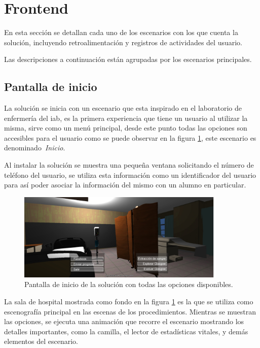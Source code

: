 \section{Frontend}

En esta sección se detallan cada uno de los escenarios con los que cuenta 
la solución, incluyendo retroalimentación y registros de actividades del 
usuario.

Las descripciones a continuación están agrupadas por los escenarios principales.

\subsection{Pantalla de inicio}

La solución se inicia con un escenario que esta inspirado en el laboratorio de
enfermería del \Gls{iab}, es la primera experiencia que tiene un
usuario al utilizar la misma, sirve como un menú principal, desde
este punto todas las opciones son accesibles para el usuario como se puede observar 
en la figura \ref{fig:pantalla_inicio}, este escenario es denominado~\emph{Inicio}.

Al instalar la solución se muestra una pequeña ventana
solicitando el número de teléfono del usuario, se utiliza esta información como un
identificador del usuario para así poder asociar la información del mismo con un
alumno en particular.

\begin{figure}[H] 
\centering 
\includegraphics[width=10cm]{solucion/images/pantalla_inicio.jpg}
\caption{Pantalla de inicio de la solución con todas las opciones disponibles.}
\label{fig:pantalla_inicio}
\end{figure}



La sala de hospital mostrada como fondo en la figura \ref{fig:pantalla_inicio} es la
que se utiliza como escenografía principal en las escenas de los procedimientos. 
Mientras se muestran las opciones, se ejecuta una animación que recorre el escenario 
mostrando los detalles importantes, como la camilla, el lector de estadísticas vitales, 
y demás elementos del escenario.

